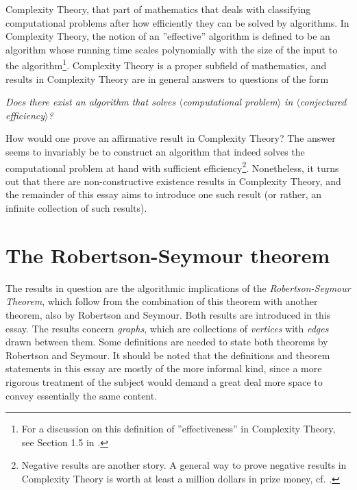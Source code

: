 Complexity Theory, that part of mathematics that deals with classifying computational problems after how efficiently they can be solved by algorithms. In Complexity Theory, the notion of an ''effective'' algorithm is defined to be an algorithm whose running time scales polynomially with the size of the input to the algorithm\footnote{For a discussion on this definition of ''effectiveness'' in Complexity Theory, see Section 1.5 in  \cite{aroraComputationalComplexityModern2009a}. }. Complexity Theory is a proper subfield of mathematics, and results in Complexity Theory are in general answers to questions of the form
\begin{center}
\emph{Does there exist an algorithm that solves $\langle$\emph{computational problem}$\rangle$ in $\langle$\emph{conjectured efficiency}$\rangle$?}
\end{center}
How would one prove an affirmative result in Complexity Theory? The answer seems to invariably be to construct an algorithm that indeed solves the computational problem at hand with sufficient efficiency\footnote{Negative results are another story. A general way to prove negative results in Complexity Theory is worth at least a million dollars in prize money, cf. \cite{VsNPProblem}.}. Nonetheless, it turns out that there are non-constructive existence results in Complexity Theory, and the remainder of this essay aims to introduce one such result (or rather, an infinite collection of such results).

\section{The Robertson-Seymour theorem}
The results in question are the algorithmic implications of the \emph{Robertson-Seymour Theorem}, which follow from the combination of this theorem with another theorem, also by Robertson and Seymour. Both results are introduced in this essay. The results concern \emph{graphs}, which are collections of \emph{vertices} with \emph{edges} drawn between them. Some definitions are needed to state both theorems by Robertson and Seymour. It should be noted that the definitions and theorem statements in this essay are mostly of the more informal kind, since a more rigorous treatment of the subject would demand a great deal more space to convey essentially the same content.

